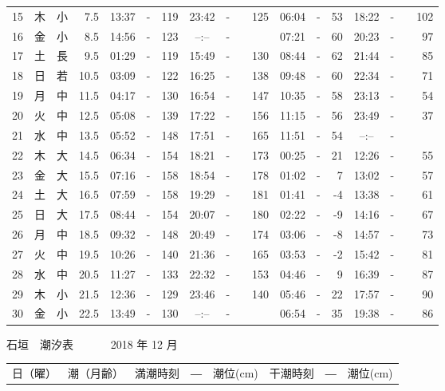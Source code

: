 \documentclass[12pt.a4j]{jsarticle}
\begin{document}
\begin{center}
\begin{table}[ht]
\begin{tabular}{|rc|cr|ccrccr|ccrccr|}
15 & 木 & 小 &  7.5 &  13:37 &-& 119  &  23:42 &-& 125  &   06:04 &-&  53  &   18:22 &-& 102  \\
16 & 金 & 小 &  8.5 &  14:56 &-& 123  &  --:-- &-&~~~~~ &   07:21 &-&  60  &   20:23 &-&  97  \\
17 & 土 & 長 &  9.5 &  01:29 &-& 119  &  15:49 &-& 130  &   08:44 &-&  62  &   21:44 &-&  85  \\
18 & 日 & 若 & 10.5 &  03:09 &-& 122  &  16:25 &-& 138  &   09:48 &-&  60  &   22:34 &-&  71  \\
19 & 月 & 中 & 11.5 &  04:17 &-& 130  &  16:54 &-& 147  &   10:35 &-&  58  &   23:13 &-&  54  \\
20 & 火 & 中 & 12.5 &  05:08 &-& 139  &  17:22 &-& 156  &   11:15 &-&  56  &   23:49 &-&  37  \\
21 & 水 & 中 & 13.5 &  05:52 &-& 148  &  17:51 &-& 165  &   11:51 &-&  54  &   --:-- &-&~~~~~ \\
22 & 木 & 大 & 14.5 &  06:34 &-& 154  &  18:21 &-& 173  &   00:25 &-&  21  &   12:26 &-&  55  \\
23 & 金 & 大 & 15.5 &  07:16 &-& 158  &  18:54 &-& 178  &   01:02 &-&   7  &   13:02 &-&  57  \\
24 & 土 & 大 & 16.5 &  07:59 &-& 158  &  19:29 &-& 181  &   01:41 &-&  -4  &   13:38 &-&  61  \\
25 & 日 & 大 & 17.5 &  08:44 &-& 154  &  20:07 &-& 180  &   02:22 &-&  -9  &   14:16 &-&  67  \\
26 & 月 & 中 & 18.5 &  09:32 &-& 148  &  20:49 &-& 174  &   03:06 &-&  -8  &   14:57 &-&  73  \\
27 & 火 & 中 & 19.5 &  10:26 &-& 140  &  21:36 &-& 165  &   03:53 &-&  -2  &   15:42 &-&  81  \\
28 & 水 & 中 & 20.5 &  11:27 &-& 133  &  22:32 &-& 153  &   04:46 &-&   9  &   16:39 &-&  87  \\
29 & 木 & 小 & 21.5 &  12:36 &-& 129  &  23:46 &-& 140  &   05:46 &-&  22  &   17:57 &-&  90  \\
30 & 金 & 小 & 22.5 &  13:49 &-& 130  &  --:-- &-&~~~~~ &   06:54 &-&  35  &   19:38 &-&  86  \\
   \hline
   \end{tabular}
\end{table}
\newpage
 {\LARGE 石垣　潮汐表　　　}
 {\large 2018 年 12 月}\\
 \begin{table}[ht]
    \begin{tabular}{|rc|cr|ccrccr|ccrccr|}
    \hline
    \multicolumn{2}{|c|}{日（曜）} & \multicolumn{2}{c|}{潮（月齢）} & \multicolumn{6}{c|}{満潮時刻　―　潮位(cm)} & \multicolumn{6}{c|}{干潮時刻　―　潮位(cm)} \\

\end{tabular}
\end{table}
\end{center}
\end{document}

